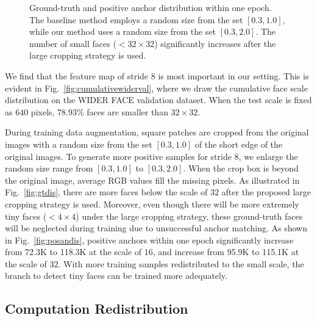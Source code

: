 \documentclass[10pt,twocolumn,letterpaper]{article}
\begin{document}
\begin{figure}[t!]
\centering
{}
\caption{Ground-truth and positive anchor distribution within one epoch. The baseline method employs a random size from the set $[0.3, 1.0]$, while our method uses a random size from the set $[0.3, 2.0]$. The number of small faces ($<32\times32$) significantly increases after the large cropping strategy is used.}
\vspace{-4mm}
\label{fig:samplereallocation}
\end{figure}

We find that the feature map of stride 8 is most important in our setting.
This is evident in Fig.~\ref{fig:cumulativewiderval}, where we draw the cumulative face scale distribution on the WIDER FACE validation dataset.
When the test scale is fixed as $640$ pixels, 78.93\% faces are smaller than $32 \times 32$.

During training data augmentation, square patches are cropped from the original images with a random size from the set $[0.3, 1.0]$ of the short edge of the original images. To generate more positive samples for stride 8, we enlarge the random size range from $[0.3, 1.0]$ to $[0.3, 2.0]$. When the crop box is beyond the original image, average RGB values fill the missing pixels. As illustrated in Fig.~\ref{fig:gtdis}, there are more faces below the scale of $32$ after the proposed large cropping strategy is used. Moreover, even though there will be more extremely tiny faces (\eg $<4\times4$) under the large cropping strategy, these ground-truth faces will be neglected during training due to unsuccessful anchor matching. As shown in Fig.~\ref{fig:posandis}, positive anchors within one epoch significantly increase from 72.3K to 118.3K at the scale of $16$, and increase from 95.9K to 115.1K at the scale of $32$. With more training samples redistributed to the small scale, the branch to detect tiny faces can be trained more adequately. 

\subsection{Computation Redistribution}
\label{sec:computation_redistribution}
\end{document}

